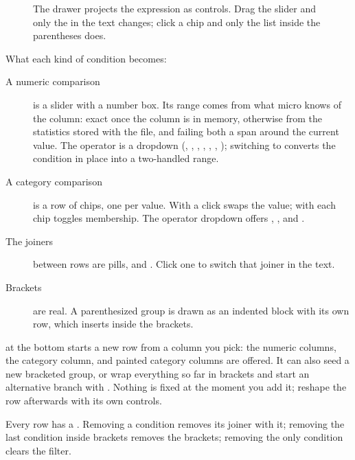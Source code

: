 \begin{figure}[htbp]
\caption{The drawer projects the expression as controls. Drag the slider and only the  in the text changes; click a chip and only the list inside the parentheses does.}\label{fig:filter-drawer-diagram}
\end{figure}

What each kind of condition becomes:

\begin{description}
\item[A numeric comparison] is a slider with a number box. Its range comes from what micro knows of the column: exact once the column is in memory, otherwise from the statistics stored with the file, and failing both a span around the current value. The operator is a dropdown (\code{>}, \code{>=}, \code{<}, \code{<=}, \code{=}, \code{!=}, ); switching to  converts the condition in place into a two-handled range.
\item[A category comparison] is a row of chips, one per value. With \code{=} a click swaps the value; with  each chip toggles membership. The operator dropdown offers \code{=}, \code{!=},  and .
\item[The joiners] between rows are pills,  and . Click one to switch that joiner in the text.
\item[Brackets] are real. A parenthesized group is drawn as an indented block with its own  row, which inserts inside the brackets.
\end{description}

 at the bottom starts a new row from a column you pick: the numeric columns, the category column, and painted category columns are offered. It can also seed a new bracketed group, or wrap everything so far in brackets and start an alternative branch with . Nothing is fixed at the moment you add it; reshape the row afterwards with its own controls.

Every row has a . Removing a condition removes its joiner with it; removing the last condition inside brackets removes the brackets; removing the only condition clears the filter.

